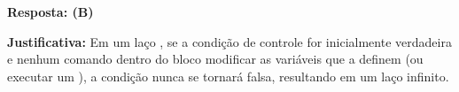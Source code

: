 \ifmostrarGabarito
\textbf{Resposta: (B)}

\textbf{Justificativa:}
Em um laço , se a condição de controle for inicialmente verdadeira e nenhum comando dentro do bloco modificar as variáveis que a definem (ou executar um ), a condição nunca se tornará falsa, resultando em um laço infinito.

\fi
